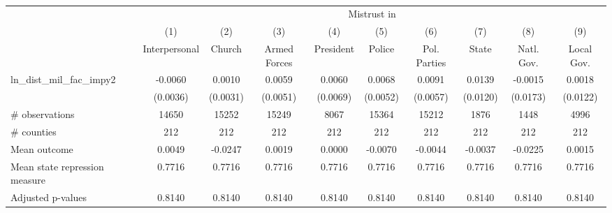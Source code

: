\def\sym#1{\ifmmode^{#1}\else\(^{#1}\)\fi} \\ \begin{tabular}{l*{9}{c}} \\ \hline\hline &\multicolumn{9}{c}{Mistrust in} \\
                    &\multicolumn{1}{c}{(1)}&\multicolumn{1}{c}{(2)}&\multicolumn{1}{c}{(3)}&\multicolumn{1}{c}{(4)}&\multicolumn{1}{c}{(5)}&\multicolumn{1}{c}{(6)}&\multicolumn{1}{c}{(7)}&\multicolumn{1}{c}{(8)}&\multicolumn{1}{c}{(9)}\\
                    &\multicolumn{1}{c}{Interpersonal}&\multicolumn{1}{c}{Church}&\multicolumn{1}{c}{Armed Forces}&\multicolumn{1}{c}{President}&\multicolumn{1}{c}{Police}&\multicolumn{1}{c}{Pol. Parties}&\multicolumn{1}{c}{State}&\multicolumn{1}{c}{Natl. Gov.}&\multicolumn{1}{c}{Local Gov.}\\
\hline
ln\_dist\_mil\_fac\_impy2&     -0.0060         &      0.0010         &      0.0059         &      0.0060         &      0.0068         &      0.0091         &      0.0139         &     -0.0015         &      0.0018         \\
                    &    (0.0036)         &    (0.0031)         &    (0.0051)         &    (0.0069)         &    (0.0052)         &    (0.0057)         &    (0.0120)         &    (0.0173)         &    (0.0122)         \\
\hline
\# observations     &       14650         &       15252         &       15249         &        8067         &       15364         &       15212         &        1876         &        1448         &        4996         \\
\# counties         &         212         &         212         &         212         &         212         &         212         &         212         &         212         &         212         &         212         \\
Mean outcome        &      0.0049         &     -0.0247         &      0.0019         &      0.0000         &     -0.0070         &     -0.0044         &     -0.0037         &     -0.0225         &      0.0015         \\
Mean state repression measure&      0.7716         &      0.7716         &      0.7716         &      0.7716         &      0.7716         &      0.7716         &      0.7716         &      0.7716         &      0.7716         \\
Adjusted p-values   &      0.8140         &      0.8140         &      0.8140         &      0.8140         &      0.8140         &      0.8140         &      0.8140         &      0.8140         &      0.8140         \\

\end{tabular}

